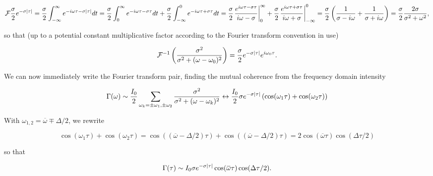 {\begin{dmath}\label{eqn:modernOptics:problemSet3:1:340}
\FF \frac{\sigma}{2} e^{-\sigma \Abs{\tau}}
=
\frac{\sigma}{2} \int_{-\infty}^\infty e^{-i\omega \tau - \sigma \Abs{\tau}} dt
=
\frac{\sigma}{2} \int_0^\infty e^{-i\omega \tau - \sigma \tau} dt
+\frac{\sigma}{2} \int_{-\infty}^0 e^{-i\omega \tau + \sigma \tau} dt
=
\frac{\sigma}{2} \evalrange{
\frac{ e^{i\omega \tau - \sigma \tau} }{
i \omega - \sigma
}
}
{ 0 } { \infty }
+
\frac{\sigma}{2} \evalrange{
\frac{ e^{i\omega \tau + \sigma \tau} }{
i \omega + \sigma
}
}
{ -\infty }{0}
=
\frac{\sigma}{2} \left( 
\inv{\sigma - i \omega}
+\inv{\sigma + i \omega}
\right)
=
\frac{\sigma}{2} \frac{2 \sigma}{ \sigma^2 + \omega^2 },
\end{dmath}

so that (up to a potential constant multiplicative factor according to the Fourier transform convention in use)

\begin{dmath}\label{eqn:modernOptics:problemSet3:1:360}
\FF^{-1} 
\left(
\frac{\sigma^2}
{
\sigma^2 + (\omega - \omega_0)^2
}
\right)
= 
\frac{\sigma}{2} e^{-\sigma \Abs{\tau}} e^{i \omega_0 \tau}.
\end{dmath}

We can now immediately write the Fourier transform pair, finding the mutual coherence from the frequency domain intensity

\begin{dmath}\label{eqn:modernOptics:problemSet3:1:380}
\Gamma(\omega) \sim \frac{I_0}{2} \sum_{\omega_k = \pm \omega_1, \pm \omega_2} 
\frac{\sigma^2}{\sigma^2 + (\omega - \omega_k)^2}
\leftrightarrow
\frac{I_0}{2}
\sigma e^{-\sigma \Abs{\tau}} \left(
\cos(\omega_1 \tau)
+\cos(\omega_2 \tau)
\right)
\end{dmath}

With $\omega_{1,2} = \overbar{\omega} \mp \Delta/2$, we rewrite

\begin{dmath}\label{eqn:modernOptics:problemSet3:1:400}
\cos(\omega_1 \tau) +\cos(\omega_2 \tau)
=
\cos\left( 
\left(
\overbar{\omega} - \Delta/2 
\right) \tau 
\right)
+
\cos\left( 
\left(
\overbar{\omega} - \Delta/2 
\right) \tau 
\right)
= 2 \cos( \overbar{\omega} \tau ) \cos ( \Delta \tau/2 )
\end{dmath}

so that

\begin{dmath}\label{eqn:modernOptics:problemSet3:1:420}
\Gamma(\tau) \sim
I_0
\sigma e^{-\sigma \Abs{\tau}} 
\cos( \overbar{\omega} \tau ) \cos ( \Delta \tau /2 ).
\end{dmath}

}
